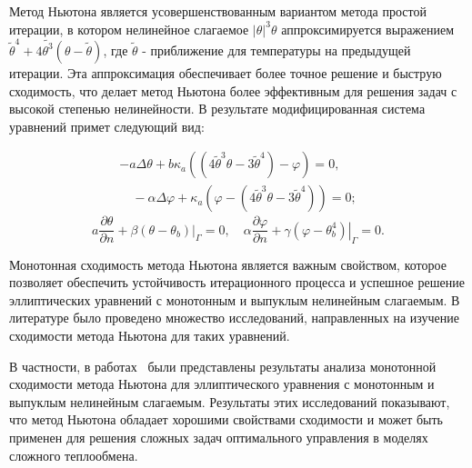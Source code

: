 Метод Ньютона является усовершенствованным вариантом метода простой итерации,
в котором нелинейное слагаемое $|\theta|^3 \theta$ аппроксимируется
выражением $\widetilde{\theta}^4+4 \widetilde{\theta^3}(\theta-\widetilde{\theta})$,
где $\widetilde{\theta}$ - приближение для температуры на предыдущей итерации.
Эта аппроксимация обеспечивает более точное решение и быструю сходимость,
что делает метод Ньютона более эффективным для
решения задач с высокой степенью нелинейности.
В результате модифицированная система уравнений примет следующий вид:

\begin{equation}
    \tag{L1}
    \label{eq:L1}
    \begin{gathered}
        -a \Delta \theta+b \kappa_{a}\left(\left(4 \widetilde{\theta}^{3}
        \theta-3 \widetilde{\theta}^{4}\right)-\varphi\right)=0,\\
        \quad-\alpha \Delta \varphi
        +\kappa_{a}\left(\varphi
        -\left(4 \widetilde{\theta}^{3}
        \theta-3 \widetilde{\theta}^{4}\right)\right)=0;
    \end{gathered}
\end{equation}
\begin{equation}
     \tag{L2}
    \label{eq:L2}
        a \frac{\partial \theta}{\partial n}
        +\left.\beta\left(\theta-\theta_{b}\right)\right|_{\Gamma}=0,
        \quad \alpha \frac{\partial \varphi}{\partial n}
        +\left.\gamma\left(\varphi-\theta_{b}^{4}\right)\right|_{\Gamma}=0.
\end{equation}

Монотонная сходимость метода Ньютона является важным свойством,
которое позволяет обеспечить устойчивость итерационного процесса
и успешное решение эллиптических уравнений
с монотонным и выпуклым нелинейным слагаемым.
В литературе было проведено множество исследований, направленных
на изучение сходимости метода Ньютона для таких уравнений.

В частности, в работах~\cite{Mukhamadiev1971, Schryer1971} были представлены
результаты анализа монотонной сходимости метода Ньютона для эллиптического
уравнения с монотонным и выпуклым нелинейным слагаемым.
Результаты этих исследований показывают, что метод Ньютона обладает
хорошими свойствами сходимости и может быть применен для решения
сложных задач оптимального управления в моделях сложного теплообмена.

